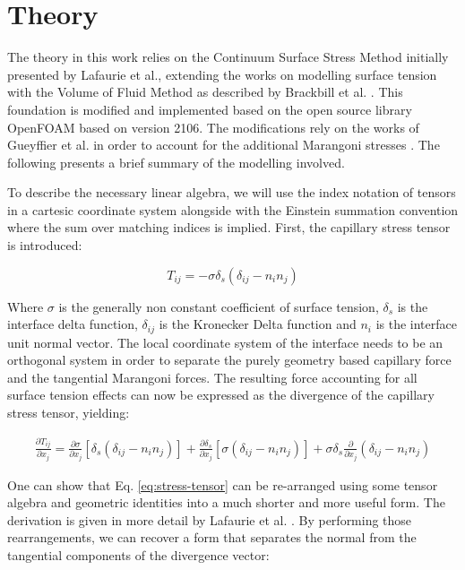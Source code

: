\documentclass[conference,final]{IEEEtran}
\begin{document}
\section{Theory}

The theory in this work relies on the Continuum Surface Stress Method initially presented by Lafaurie et al., extending the works on modelling surface tension with the Volume of Fluid Method as described by Brackbill et al. \cite{lafaurieModellingMergingFragmentation1994,brackbillContinuumMethodModeling1992}. This foundation is modified and implemented based on the open source library OpenFOAM based on version 2106. The modifications rely on the works of Gueyffier et al. in order to account for the additional Marangoni stresses \cite{gueyffierVolumeofFluidInterfaceTracking1999}. The following presents a brief summary of the modelling involved.

To describe the necessary linear algebra, we will use the index notation of tensors in a cartesic coordinate system alongside with the Einstein summation convention where the sum over matching indices is implied. First, the capillary stress tensor is introduced:

\begin{equation}
    T_{ij} = - \sigma \delta_s (\delta_{ij} - n_i n_j)
\end{equation}

Where $\sigma$ is the generally non constant coefficient of surface tension, $\delta_s$ is the interface delta function, $\delta_{ij}$ is the Kronecker Delta function and $n_i$ is the interface unit normal vector. The local coordinate system of the interface needs to be an orthogonal system in order to separate the purely geometry based capillary force and the tangential Marangoni forces.
The resulting force accounting for all surface tension effects can now be expressed as the divergence of the capillary stress tensor, yielding:

\begin{align}
    \frac{\partial T_{ij}}{\partial x_j} = \frac{\partial \sigma}{\partial x_j} [\delta_s(\delta_{ij} - n_i n_j)] + \frac{\partial \delta_s}{\partial x_j} [\sigma (\delta_{ij} - n_i n_j)] + \sigma \delta_s \frac{\partial}{\partial x_j} (\delta_{ij} - n_i n_j) \label{eq:stress-tensor}
\end{align}

One can show that Eq. \ref{eq:stress-tensor} can be re-arranged using some tensor algebra and geometric identities into a much shorter and more useful form. The derivation is given in more detail by Lafaurie et al. \cite{lafaurieModellingMergingFragmentation1994}. By performing those rearrangements, we can recover a form that separates the normal from the tangential components of the divergence vector:
\end{document}
